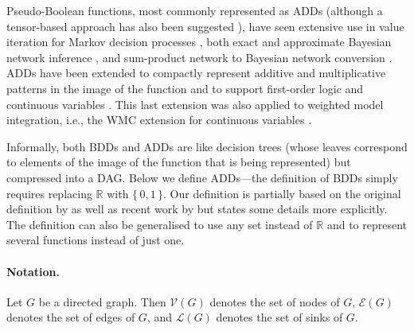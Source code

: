 Pseudo-Boolean functions, most commonly represented as ADDs (although a tensor-based approach has also been suggested \citep{DBLP:journals/corr/abs-1908-04381,DBLP:conf/cp/DudekPV20}), have seen extensive use in value iteration for Markov decision processes \citep{DBLP:conf/uai/HoeySHB99}, both exact and approximate Bayesian network inference \citep{DBLP:conf/ijcai/ChaviraD07,DBLP:conf/uai/GogateD11}, and sum-product network to Bayesian network conversion \citep{DBLP:conf/icml/ZhaoMP15}. ADDs have been extended to compactly represent additive and multiplicative patterns in the image of the function \citep{DBLP:conf/ijcai/SannerM05} and to support first-order logic \citep{DBLP:journals/ai/SannerB09} and continuous variables \citep{DBLP:conf/uai/SannerDB11}. This last extension was also applied to weighted model integration, i.e., the WMC extension for continuous variables \citep{DBLP:conf/ijcai/BellePB15,DBLP:conf/ijcai/KolbMSBK18}.

Informally, both BDDs and ADDs are like decision trees (whose leaves correspond to elements of the image of the function that is being represented) but compressed into a DAG. Below we define ADDs---the definition of BDDs simply requires replacing $\mathbb{R}$ with $\{\, 0, 1 \,\}$. Our definition is partially based on the original definition by \citet{DBLP:journals/fmsd/BaharFGHMPS97} as well as recent work by \citet{DBLP:conf/cp/DudekPV20} but states some details more explicitly. The definition can also be generalised to use any set instead of $\mathbb{R}$ and to represent several functions instead of just one.

\paragraph{Notation.} Let $G$ be a directed graph. Then $\mathcal{V}(G)$ denotes the set of nodes of $G$, $\mathcal{E}(G)$ denotes the set of edges of $G$, and $\mathcal{L}(G)$ denotes the set of sinks of $G$.

